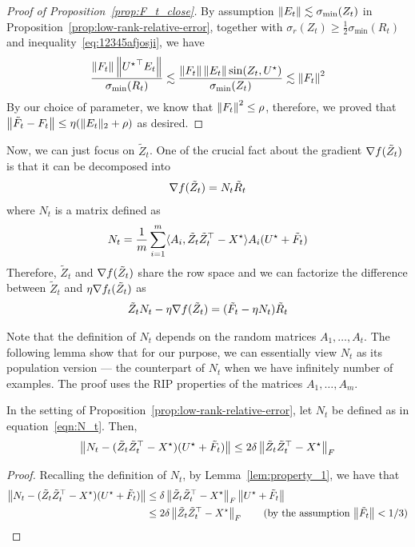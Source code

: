 \begin{proof}[Proof of Proposition~\ref{prop:F_t_close}]
By assumption $\left\|E_t\right\| \lesssim \sigma_{\min}(Z_t) $ in Proposition~\ref{prop:low-rank-relative-error}, together with $\sigma_{r}(Z_t) \geq \frac{1}{2} \sigma_{\min} (R_t)$ and inequality~\ref{eq:12345afjosji}, we have
\begin{align*}
\frac{ \left\|F_t\right\| \left\|{{U}^\star}^{\top} E_t \right\| }{\sigma_{\min}(R_t)} \lesssim \frac{  \left\|F_t\right\|\left\|E_t\right\|  \sin(Z_t, {{U}^\star})}{\sigma_{\min}(Z_t)} \lesssim \left\|F_t\right\|^2
\end{align*}
By our choice of parameter, we know that $\left\|F_t\right\|^2 \leq \rho$, therefore, we proved that $\left\|\tilde{F}_t - F_t\right\|  \leq \eta( \| E_t\|_2 + \rho )$ as desired.
\end{proof}

Now, we can just focus on $\tilde{Z}_t$. One of the crucial fact about the gradient $\nabla f(\tilde{Z}_t)$ is that it can be decomposed into 
\begin{align*}
\nabla f(\tilde{Z}_t) = N_t \tilde{R}_t 
\end{align*}
where $N_t$ is a matrix defined as 
\begin{align}
N_t =  \frac{1}{m}\sum_{i = 1}^m\langle {A}_i, \tilde{Z}_t\tilde{Z}_t^\top - {X}^\star \rangle{A}_i({{U}^\star} + \tilde{F}_t) \label{eqn:N_t}
\end{align}
Therefore, $\tilde{Z}_t$ and $\nabla f(\tilde{Z}_t)$ share the row space and we can factorize the difference between $\tilde{Z}_t$ and $\eta \nabla f_t(\tilde{Z}_t)$ as
\begin{align*}
\tilde{Z}_tN_t - \eta \nabla f(\tilde{Z}_t) = (\tilde{F}_t - \eta N_t)\tilde{R}_t
\end{align*}

Note that the definition of $N_t$ depends on the random matrices $A_1,\dots, A_t$. The following lemma show that for our purpose, we can essentially view $N_t$ as its population version --- the counterpart of $N_t$ when we have infinitely number of examples. The proof uses the RIP properties of the matrices $A_1,\dots, A_m$. 



\begin{lem}\label{lem:M}
	In the setting of Proposition~\ref{prop:low-rank-relative-error}, let $N_t$ be defined as in equation~\eqref{eqn:N_t}. Then, 
	\begin{align*}
	\left\|N_t - (\tilde{Z}_t\tilde{Z}_t^\top - X^\star)({{U}^\star} + \tilde{F}_t)\right\| \le 2\delta \left\|\tilde{Z}_t\tilde{Z}_t^\top - X^\star\right\|_F
	\end{align*}
\end{lem}
\begin{proof}
Recalling the definition of $N_t$, 
by Lemma~\ref{lem:property_1}, we have that 
\begin{align}\label{place_2}
\Norm{N_t - (\tilde{Z}_t\tilde{Z}_t^\top - X^\star)(\bUg + \tilde{F}_t)} & \le \delta \Norm{\tilde{Z}_t\tilde{Z}_t^\top - X^\star}_F \Norm{\bUg + \tilde{F}_t} \\
& \le 2\delta \Norm{\tilde{Z}_t\tilde{Z}_t^\top - X^\star}_F \tag{by the assumption $\Norm{\tilde{F}_t}< 1/3$}
\end{align}
\end{proof}


